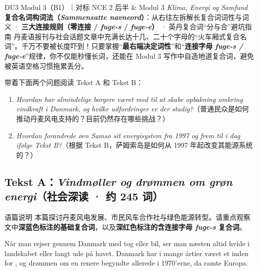 {DU3 Modul 3（B1）｜对标 NCE 2 后半 \& Modul 3 \textit{Klima, Energi og Samfund}}
{\textbf{复合名词构词法（\textit{Sammensatte navneord}）}：从右往左拆解长复合词词性与词义 · \textbf{三大连接规则（零连接 / \textit{fuge-s} / \textit{fuge-e}）} · 英丹复合词“分与合”避坑指南}
{丹麦语报刊与社会话题文章中充满长达十几、二十个字母的“火车厢式复合名词”。千万不要被长度吓到！只要掌握“\textbf{最右端决定词性}”和“\textbf{连接字母 \textit{fuge-s / fuge-e}}”规律，你不仅能秒懂长词，还能在 Modul 3 写作中自造地道复合词，避免被英语空格习惯拖累丢分。}

\begin{foerduleaeser}
带着下面两个问题阅读 Tekst A 和 Tekst B：
\begin{enumerate}
  \item \textit{Hvordan har almindelige borgere været med til at skabe opbakning omkring vindkraft i Danmark, og hvilke udfordringer er der stadig?}（普通民众是如何推动丹麦风电支持的？目前仍然存在哪些挑战？）
  \item \textit{Hvordan forandrede øen Samsø sit energisystem fra 1997 og frem til i dag ifølge Tekst B?}（根据 Tekst B，萨姆索岛是如何从 1997 年起改变其能源系统的？）
\end{enumerate}
\end{foerduleaeser}


\subsection*{Tekst A：\textit{Vindmøller og drømmen om grøn energi}（社会深读 · 约 245 词）}

\begin{tipbox}{语篇说明}
本篇探讨丹麦风电发展、市民风车合作社与绿色能源转型。请重点观察文中\textbf{\color{NCDNavy}深蓝色标注的基础复合词}，以及\textbf{\color{NCDRed}深红色标注的含连接字母 \textit{fuge-s} 复合词}。
\end{tipbox}

Når man rejser gennem Danmark med tog eller bil, ser man næsten altid hvide  i landskabet eller langt ude på havet. Danmark har i mange årtier været et  inden for , og drømmen om en renere  begyndte allerede i 1970'erne, da  ramte Europa.

